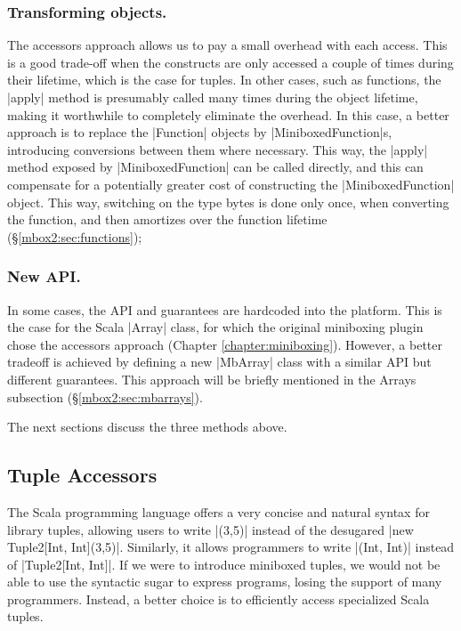 \subsubsection*{Transforming objects.} The accessors approach allows us to pay a small overhead with each access. This is a good trade-off when the constructs are only accessed a couple of times during their lifetime, which is the case for tuples. In other cases, such as functions, the |apply| method is presumably called many times during the object lifetime, making it worthwhile to completely eliminate the overhead. In this case, a better approach is to replace the |Function| objects by |MiniboxedFunction|s, introducing conversions between them where necessary. This way, the |apply| method exposed by |MiniboxedFunction| can be called directly, and this can compensate for a potentially greater cost of constructing the |MiniboxedFunction| object. This way, switching on the type bytes is done only once, when converting the function, and then amortizes over the function lifetime (\S\ref{mbox2:sec:functions});



\subsubsection*{New API.} In some cases, the API and guarantees are hardcoded into the platform. This is the case for the Scala |Array| class, for which the original miniboxing plugin chose the accessors approach (Chapter \ref{chapter:miniboxing}). However, a better tradeoff is achieved by defining a new |MbArray| class with a similar API but different guarantees. This approach will be briefly mentioned in the Arrays subsection (\S\ref{mbox2:sec:mbarrays}).

The next sections discuss the three methods above.



\subsection{Tuple Accessors}
\label{mbox2:sec:tuples}



The Scala programming language offers a very concise and natural syntax for library tuples, allowing users to write |(3,5)| instead of the desugared |new Tuple2[Int, Int](3,5)|. Similarly, it allows programmers to write |(Int, Int)| instead of |Tuple2[Int, Int]|. If we were to introduce miniboxed tuples, we would not be able to use the syntactic sugar to express programs, losing the support of many programmers. Instead, a better choice is to efficiently access specialized Scala tuples.

